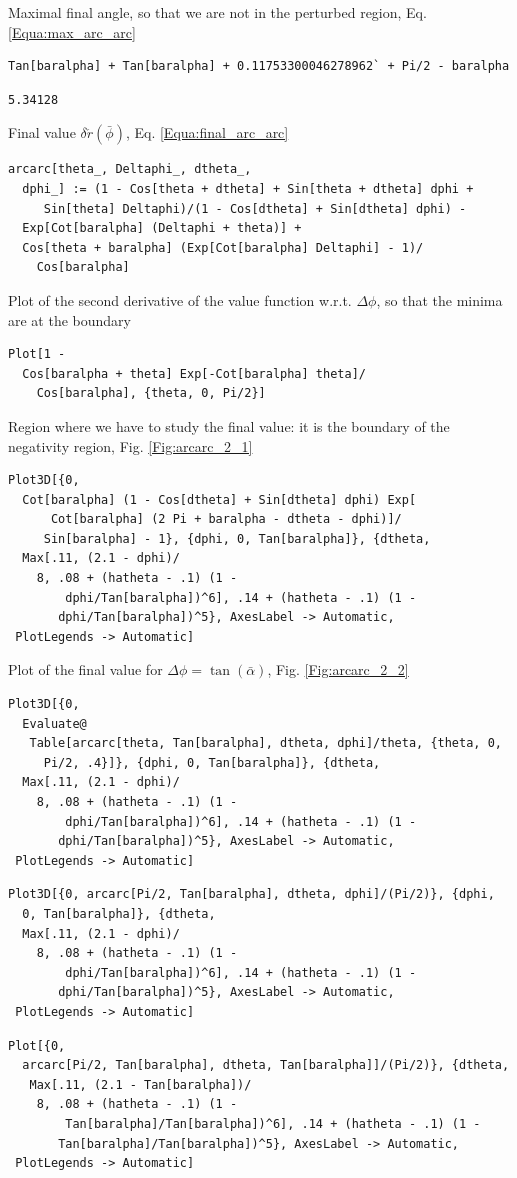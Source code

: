 \documentclass[reqno]{amsart}
\theoremstyle{definition} \newtheorem{definition}{Definition}[section]
\theoremstyle{definition} \newtheorem{remark}[definition]{Remark}
\theoremstyle{plain} \newtheorem{lemma}[definition]{Lemma}
\theoremstyle{plain} \newtheorem{proposition}[definition]{Proposition}
\theoremstyle{plain} \newtheorem{theorem}[definition]{Theorem}
\theoremstyle{plain} \newtheorem{corollary}[definition]{Corollary}
\theoremstyle{definition} \newtheorem{example}[definition]{Example}
\theoremstyle{plain} \newtheorem{claim}[clai]{Claim}
\theoremstyle{definition} \newtheorem{assumption}[definition]{Assumption}
\theoremstyle{definition} \newtheorem{observation}[definition]{Observation}
\newcommand{\1}{\mathbbm 1}
\newcommand{\smed}{\medskip}
\numberwithin{equation}{section} %
\theoremstyle{plain} \newtheorem*{theorem*}{Theorem}
\theoremstyle{plain} \newtheorem{mthm}[maintheorem]{Main Theorem}
\theoremstyle{plain} \newtheorem*{mthm*}{Main Theorem}
\theoremstyle{plain} \newtheorem*{conjecture*}{Conjecture}
\theoremstyle{plain} \newtheorem{conjecture}[definition]{Conjecture}
\theoremstyle{plain} \newtheorem*{problem*}{Problem}
\begin{document}
\noindent Maximal final angle, so that we are not in the perturbed region, Eq. \eqref{Equa:max_arc_arc}
\smed
\begin{verbatim}
Tan[baralpha] + Tan[baralpha] + 0.11753300046278962` + Pi/2 - baralpha
\end{verbatim}
\begin{verbatim}
5.34128
\end{verbatim}
\smed
Final value $\delta \check r(\bar \phi)$, Eq. \eqref{Equa:final_arc_arc}
\smed
\begin{verbatim}
arcarc[theta_, Deltaphi_, dtheta_, 
  dphi_] := (1 - Cos[theta + dtheta] + Sin[theta + dtheta] dphi + 
     Sin[theta] Deltaphi)/(1 - Cos[dtheta] + Sin[dtheta] dphi) - 
  Exp[Cot[baralpha] (Deltaphi + theta)] + 
  Cos[theta + baralpha] (Exp[Cot[baralpha] Deltaphi] - 1)/
    Cos[baralpha]
\end{verbatim}
\smed
Plot of the second derivative of the value function w.r.t. $\Delta \phi$, so that the minima are at the boundary
\smed
\begin{verbatim}
Plot[1 - 
  Cos[baralpha + theta] Exp[-Cot[baralpha] theta]/
    Cos[baralpha], {theta, 0, Pi/2}]
\end{verbatim}
\smed
Region where we have to study the final value: it is the boundary of the negativity region, Fig. \ref{Fig:arcarc_2_1}
\smed
\begin{verbatim}
Plot3D[{0, 
  Cot[baralpha] (1 - Cos[dtheta] + Sin[dtheta] dphi) Exp[
      Cot[baralpha] (2 Pi + baralpha - dtheta - dphi)]/
     Sin[baralpha] - 1}, {dphi, 0, Tan[baralpha]}, {dtheta, 
  Max[.11, (2.1 - dphi)/
    8, .08 + (hatheta - .1) (1 - 
        dphi/Tan[baralpha])^6], .14 + (hatheta - .1) (1 - 
       dphi/Tan[baralpha])^5}, AxesLabel -> Automatic, 
 PlotLegends -> Automatic]
\end{verbatim}
\smed
Plot of the final value for $\Delta \phi = \tan(\bar \alpha)$, Fig. \ref{Fig:arcarc_2_2}
\smed
\begin{verbatim}
Plot3D[{0, 
  Evaluate@
   Table[arcarc[theta, Tan[baralpha], dtheta, dphi]/theta, {theta, 0, 
     Pi/2, .4}]}, {dphi, 0, Tan[baralpha]}, {dtheta, 
  Max[.11, (2.1 - dphi)/
    8, .08 + (hatheta - .1) (1 - 
        dphi/Tan[baralpha])^6], .14 + (hatheta - .1) (1 - 
       dphi/Tan[baralpha])^5}, AxesLabel -> Automatic, 
 PlotLegends -> Automatic]
\end{verbatim}
\begin{verbatim}
Plot3D[{0, arcarc[Pi/2, Tan[baralpha], dtheta, dphi]/(Pi/2)}, {dphi, 
  0, Tan[baralpha]}, {dtheta, 
  Max[.11, (2.1 - dphi)/
    8, .08 + (hatheta - .1) (1 - 
        dphi/Tan[baralpha])^6], .14 + (hatheta - .1) (1 - 
       dphi/Tan[baralpha])^5}, AxesLabel -> Automatic, 
 PlotLegends -> Automatic]
\end{verbatim}
\begin{verbatim}
Plot[{0, 
  arcarc[Pi/2, Tan[baralpha], dtheta, Tan[baralpha]]/(Pi/2)}, {dtheta,
   Max[.11, (2.1 - Tan[baralpha])/
    8, .08 + (hatheta - .1) (1 - 
        Tan[baralpha]/Tan[baralpha])^6], .14 + (hatheta - .1) (1 - 
       Tan[baralpha]/Tan[baralpha])^5}, AxesLabel -> Automatic, 
 PlotLegends -> Automatic]
\end{verbatim}
\end{document}
